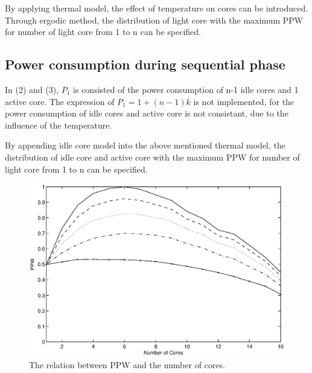 By applying thermal model, the effect of temperature on cores can be introduced. 
Through ergodic method, the distribution of light core with the maximum PPW
for number of light core from 1 to n can be specified.


\subsection{Power consumption during sequential phase}

In (2) and (3), $P_{1}$ is consisted of the power consumption of n-1 idle cores and 1 active 
core. The expression of $P_{1} = 1+(n-1)k$ is not implemented, for the power consumption of 
idle cores and active core is not consistant, due to the influence of the temperature.

By appending idle core model into the above mentioned thermal model, the distribution of idle
core and active core with the maximum PPW for number of light core from 1 to n can be specified.

\begin{figure}
\centering
\includegraphics[width=1\columnwidth]{fig/ppw_alpha_ratio.eps}
\caption{The relation between PPW and the number of cores.
}
\label{fig:ppw_alpha_ratio}
\end{figure}